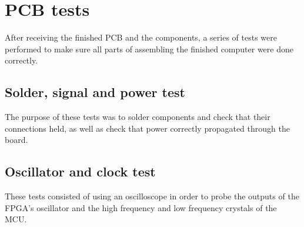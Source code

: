 \documentclass[../main/report.tex]{subfiles}
\begin{document}
\section{PCB tests}

After receiving the finished PCB and the components, a series of tests were performed to make sure all parts of assembling the finished computer were done correctly.

\subsection{Solder, signal and power test}

The purpose of these tests was to solder components and check that their connections held, as well as check that power correctly propagated through the board.



\subsection{Oscillator and clock test}

These tests consisted of using an oscilloscope in order to probe the outputs of the FPGA's oscillator and the high frequency and low frequency crystals of the MCU.


\end{document}
